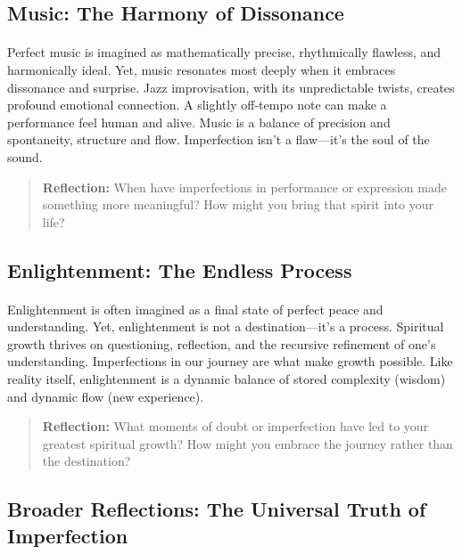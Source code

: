 \documentclass[12pt]{article}
\begin{document}
\subsection{Music: The Harmony of Dissonance}
\paragraph{}
Perfect music is imagined as mathematically precise, rhythmically flawless, and harmonically ideal. Yet, music resonates most deeply when it embraces dissonance and surprise. Jazz improvisation, with its unpredictable twists, creates profound emotional connection. A slightly off-tempo note can make a performance feel human and alive. Music is a balance of precision and spontaneity, structure and flow. Imperfection isn’t a flaw—it’s the soul of the sound.

\begin{quote}
\textbf{Reflection:}  
When have imperfections in performance or expression made something more meaningful? How might you bring that spirit into your life?
\end{quote}

\subsection{Enlightenment: The Endless Process}
\paragraph{}
Enlightenment is often imagined as a final state of perfect peace and understanding. Yet, enlightenment is not a destination—it’s a process. Spiritual growth thrives on questioning, reflection, and the recursive refinement of one’s understanding. Imperfections in our journey are what make growth possible. Like reality itself, enlightenment is a dynamic balance of stored complexity (wisdom) and dynamic flow (new experience).

\begin{quote}
\textbf{Reflection:}  
What moments of doubt or imperfection have led to your greatest spiritual growth? How might you embrace the journey rather than the destination?
\end{quote}

\subsection*{Broader Reflections: The Universal Truth of Imperfection}
\end{document}
